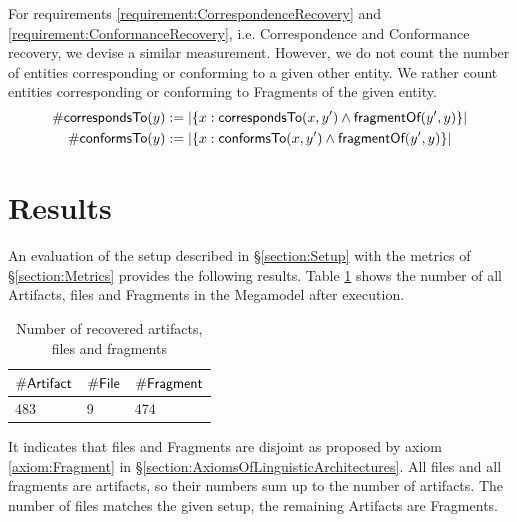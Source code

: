 For requirements \ref{requirement:CorrespondenceRecovery} and \ref{requirement:ConformanceRecovery}, i.e. \gls{Correspondence} and \gls{Conformance} recovery, we devise a similar measurement.
However, we do not count the number of entities corresponding or conforming to a given other entity.
We rather count entities corresponding or conforming to \glspl{Fragment} of the given entity.
\begin{align*}
\#\textsf{correspondsTo}(y) &:=
|\{ x : \textsf{correspondsTo}(x,y') \wedge \textsf{fragmentOf}(y',y)  \}|
\\
\#\textsf{conformsTo}(y) &:=
|\{ x : \textsf{conformsTo}(x,y') \wedge \textsf{fragmentOf}(y',y)  \}|
\end{align*}

\section{Results}
\label{section:Results}
An evaluation of the setup described in §\ref{section:Setup} with the metrics of §\ref{section:Metrics} provides the following results.
Table \ref{table:NumberOfRecoveredArtifactsFilesAndFragments} shows the number of all \glspl{Artifact}, files and \glspl{Fragment} in the \gls{Megamodel} after execution.
\begin{table}[h!]
\begin{center}
\begin{tabular}{|l|l|l|}
\hline
$\#\textsf{Artifact}$ & $\#\textsf{File}$ & $\#\textsf{Fragment}$
\\ \hline
483 & 9 & 474 
\\ \hline
\end{tabular}
\end{center}
\caption{Number of recovered artifacts, files and fragments}
\label{table:NumberOfRecoveredArtifactsFilesAndFragments}
\end{table}
It indicates that files and \glspl{Fragment} are disjoint as proposed by axiom \ref{axiom:Fragment} in §\ref{section:AxiomsOfLinguisticArchitectures}.
All files and all fragments are artifacts, so their numbers sum up to the number of artifacts.
The number of files matches the given setup, the remaining \glspl{Artifact} are \glspl{Fragment}.

